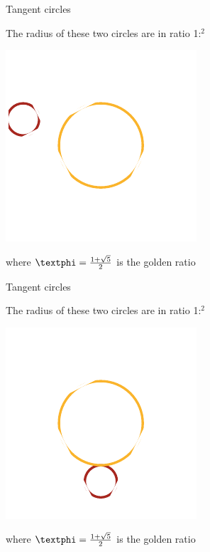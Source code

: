 \documentclass[14pt]{beamer}
\begin{document}

    \begin{frame}{Tangent circles}
        \begin{center}
            The radius of these two circles are in ratio 1:\textphi$^2$
        \end{center}\medskip
        \hspace{6.18em} \includegraphics[scale=1.0]{figures/figure019h.pdf} \\
        \begin{center}
             where $\text{\textphi} =\tfrac{1+\sqrt{5}}{2}$ is the golden ratio
        \end{center}
    \end{frame}


    \begin{frame}{Tangent circles}
        \begin{center}
            The radius of these two circles are in ratio 1:\textphi$^2$
        \end{center}\medskip
        \hspace{6.18em} \includegraphics[scale=1.0]{figures/figure019i.pdf} \\
        \begin{center}
             where $\text{\textphi} =\tfrac{1+\sqrt{5}}{2}$ is the golden ratio
        \end{center}
    \end{frame}
\end{document}
